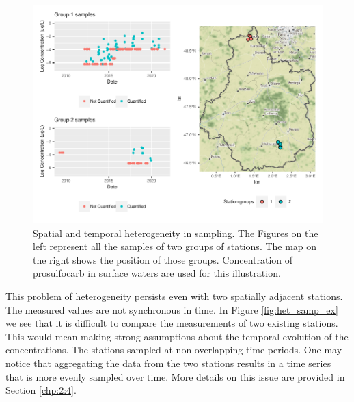 \begin{figure}[htbp]
    \centering
    \includegraphics{figs/Chap3/Het_sampling.pdf}
    \caption{Spatial and temporal heterogeneity in sampling. The Figures on the left represent all the samples of two groups of stations. The map on the right shows the position of those groups. Concentration of prosulfocarb in surface waters are used for this illustration.}
    \label{fig:het_sampspat}
\end{figure}

This problem of heterogeneity persists even with two spatially adjacent stations. The measured values are not synchronous in time. In Figure \ref{fig:het_samp_ex} we see that it is difficult to compare the measurements of two existing stations. This would mean making strong assumptions about the temporal evolution of the concentrations. The stations sampled at non-overlapping time periods. One may notice that aggregating the data from the two stations results in a time series that is more evenly sampled over time. More details on this issue are provided in Section \ref{chp:2:4}.

